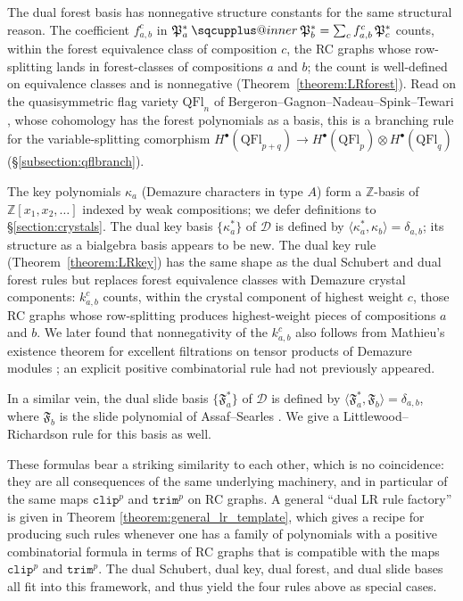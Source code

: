 \documentclass{amsart}
\makeatletter
\newcommand{\sqcupplus@inner}[2]{%
  \vcenter{\hbox{\ooalign{%
    \hfil$\m@th#1\sqcup$\hfil\cr
    \hfil\raisebox{0.15ex}{$\m@th#1\scriptscriptstyle+$}\hfil\cr
  }}}%
}
\newcommand{\sqcupplus}{\mathbin{\mathpalette\sqcupplus@inner\relax}}
\theoremstyle{definition}
\theoremstyle{remark}
\numberwithin{equation}{subsection}
\newcommand{\trm}{\mathtt{trim}}
\newcommand{\clp}{\mathtt{clip}}
\newcommand{\slide}{\mathfrak{F}}
\newcommand{\dcoma}{\mathcal{D}}
\newcommand{\forest}{\mathfrak{P}}
\makeatother
\begin{document}
The dual forest basis has nonnegative structure constants for the same structural reason. The coefficient $f_{a,b}^c$ in $\forest_a^*\sqcupplus\forest_b^*=\sum_c f_{a,b}^c\,\forest_c^*$ counts, within the forest equivalence class of composition $c$, the RC graphs whose row-splitting lands in forest-classes of compositions $a$ and $b$; the count is well-defined on equivalence classes and is nonnegative (Theorem~\ref{theorem:LRforest}). Read on the quasisymmetric flag variety $\mathrm{QFl}_n$ of Bergeron--Gagnon--Nadeau--Spink--Tewari \cite{bergeron2025qsymflag}, whose cohomology has the forest polynomials as a basis, this is a branching rule for the variable-splitting comorphism $H^\bullet(\mathrm{QFl}_{p+q})\to H^\bullet(\mathrm{QFl}_p)\otimes H^\bullet(\mathrm{QFl}_q)$ (\S\ref{subsection:qflbranch}).

The key polynomials $\kappa_a$ (Demazure characters in type $A$) form a $\mathbb{Z}$-basis of $\mathbb{Z}[x_1,x_2,\ldots]$ indexed by weak compositions; we defer definitions to \S\ref{section:crystals}. The dual key basis $\{\kappa_a^*\}$ of $\dcoma$ is defined by $\langle\kappa_a^*,\kappa_b\rangle=\delta_{a,b}$; its structure as a bialgebra basis appears to be new. The dual key rule (Theorem~\ref{theorem:LRkey}) has the same shape as the dual Schubert and dual forest rules but replaces forest equivalence classes with Demazure crystal components: $k_{a,b}^c$ counts, within the crystal component of highest weight $c$, those RC graphs whose row-splitting produces highest-weight pieces of compositions $a$ and $b$. We later found that nonnegativity of the $k_{a,b}^c$ also follows from Mathieu's existence theorem for excellent filtrations on tensor products of Demazure modules \cite{mathieu1990filtrations}; an explicit positive combinatorial rule had not previously appeared.

In a similar vein, the dual slide basis $\{\slide_a^*\}$ of $\dcoma$ is defined by $\langle\slide_a^*,\slide_b\rangle=\delta_{a,b}$, where $\slide_b$ is the slide polynomial of Assaf--Searles \cite{assaf2017slide}. We give a Littlewood--Richardson rule for this basis as well.

These formulas bear a striking similarity to each other, which is no coincidence: they are all consequences of the same underlying machinery, and in particular of the same maps $\clp^p$ and $\trm^p$ on RC graphs. A general ``dual LR rule factory'' is given in Theorem \ref{theorem:general_lr_template}, which gives a recipe for producing such rules whenever one has a family of polynomials with a positive combinatorial formula in terms of RC graphs that is compatible with the maps $\clp^p$ and $\trm^p$. The dual Schubert, dual key, dual forest, and dual slide bases all fit into this framework, and thus yield the four rules above as special cases.
\end{document}
